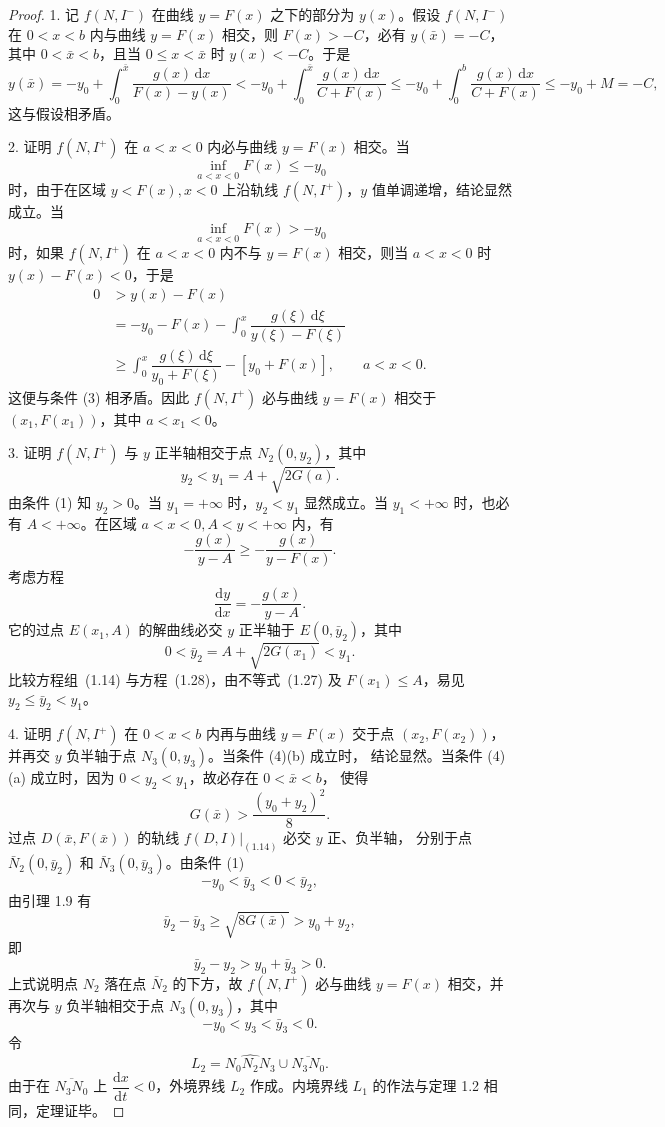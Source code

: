 \begin{proof}
1. 记 $f(N,I^-)$ 在曲线 $y=F(x)$ 之下的部分为 $y(x)$。假设
$f(N,I^-)$ 在 $0<x<b$ 内与曲线 $y=F(x)$ 相交，则 $F(x)>-C$，必有
$y(\bar x)=-C$，其中 $0<\bar x<b$，且当 $0\leq x<\bar x$ 时
$y(x)<-C$。于是
\[
  y(\bar x)=-y_0+\int_0^{\bar x}\dfrac{g(x)\,\mathrm{d}x}{F(x)-y(x)}
  <-y_0+\int_0^{\bar x}\dfrac{g(x)\,\mathrm{d}x}{C+F(x)}
  \leq-y_0+\int_0^b\dfrac{g(x)\,\mathrm{d}x}{C+F(x)}
  \leq-y_0+M=-C,
\]
这与假设相矛盾。

2. 证明 $f(N,I^+)$ 在 $a<x<0$ 内必与曲线 $y=F(x)$ 相交。当
\[
  \inf_{a<x<0}F(x)\leq-y_0
\]
时，由于在区域 $y<F(x),x<0$ 上沿轨线 $f(N,I^+)$，$y$ 值单调递增，结论显然
成立。当
\[
  \inf_{a<x<0}F(x)>-y_0
\]
时，如果 $f(N,I^+)$ 在 $a<x<0$ 内不与 $y=F(x)$ 相交，则当 $a<x<0$ 时
$y(x)-F(x)<0$，于是
\[
\begin{aligned}
  0&>y(x)-F(x)\\
   &=-y_0-F(x)-\int_0^x\dfrac{g(\xi)\,\mathrm{d}\xi}{y(\xi)-F(\xi)}\\
   &\geq\int_0^x\dfrac{g(\xi)\,\mathrm{d}\xi}{y_0+F(\xi)}-[y_0+F(x)],
   \qquad a<x<0.
\end{aligned}
\]
这便与条件 (3) 相矛盾。因此 $f(N,I^+)$ 必与曲线 $y=F(x)$ 相交于
$(x_1,F(x_1))$，其中 $a<x_1<0$。

3. 证明 $f(N,I^+)$ 与 $y$ 正半轴相交于点 $N_2(0,y_2)$，其中
\[
  y_2<y_1=A+\sqrt{2G(a)}.
\]
由条件 (1) 知 $y_2>0$。当 $y_1=+\infty$ 时，$y_2<y_1$ 显然成立。当
$y_1<+\infty$ 时，也必有 $A<+\infty$。在区域 $a<x<0,A<y<+\infty$ 内，有
\[
  -\dfrac{g(x)}{y-A}\geq-\dfrac{g(x)}{y-F(x)}. \tag{1.27}
\]
考虑方程
\[
  \dfrac{\mathrm{d}y}{\mathrm{d}x}=-\dfrac{g(x)}{y-A}. \tag{1.28}
\]
它的过点 $E(x_1,A)$ 的解曲线必交 $y$ 正半轴于 $E(0,\bar y_2)$，其中
\[
  0<\bar y_2=A+\sqrt{2G(x_1)}<y_1.
\]
比较方程组~(1.14) 与方程~(1.28)，由不等式~(1.27) 及 $F(x_1)\leq A$，易见
$y_2\leq\bar y_2<y_1$。

4. 证明 $f(N,I^+)$ 在 $0<x<b$ 内再与曲线 $y=F(x)$ 交于点
$(x_2,F(x_2))$，并再交 $y$ 负半轴于点 $N_3(0,y_3)$。当条件 (4)(b) 成立时，
结论显然。当条件 (4)(a) 成立时，因为 $0<y_2<y_1$，故必存在 $0<\bar x<b$，
使得
\[
  G(\bar x)>\dfrac{(y_0+y_2)^2}{8}.
\]
过点 $D(\bar x,F(\bar x))$ 的轨线 $f(D,I)|_{(1.14)}$ 必交 $y$ 正、负半轴，
分别于点 $\bar N_2(0,\bar y_2)$ 和 $\bar N_3(0,\bar y_3)$。由条件 (1)
\[
  -y_0<\bar y_3<0<\bar y_2,
\]
由引理 1.9 有
\[
  \bar y_2-\bar y_3\geq\sqrt{8G(\bar x)}>y_0+y_2,
\]
即
\[
  \bar y_2-y_2>y_0+\bar y_3>0.
\]
上式说明点 $N_2$ 落在点 $\bar N_2$ 的下方，故 $f(N,I^+)$ 必与曲线 $y=F(x)$
相交，并再次与 $y$ 负半轴相交于点 $N_3(0,y_3)$，其中
\[
  -y_0<y_3<\bar y_3<0.
\]
令
\[
  L_2=\widehat{N_0N_2N_3}\cup\overline{N_3N_0}.
\]
由于在 $\overline{N_3N_0}$ 上 $\dfrac{\mathrm{d}x}{\mathrm{d}t}<0$，外境界线
$L_2$ 作成。内境界线 $L_1$ 的作法与定理 1.2 相同，定理证毕。\qedhere
\end{proof}

